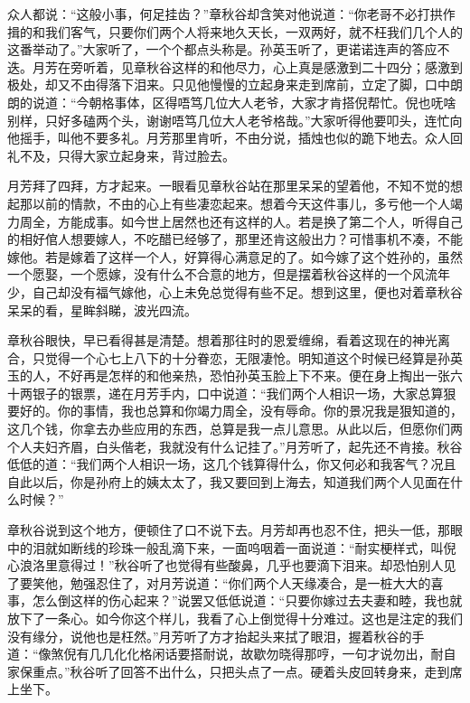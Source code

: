 \documentclass[12pt,UTF8]{ctexbook}
\begin{document}
{{{众人都说：“这般小事，何足挂齿？”章秋谷却含笑对他说道：“你老哥不必打拱作揖的和我们客气，只要你们两个人将来地久天长，一双两好，就不枉我们几个人的这番举动了。”大家听了，一个个都点头称是。孙英玉听了，更诺诺连声的答应不迭。月芳在旁听着，见章秋谷这样的和他尽力，心上真是感激到二十四分；感激到极处，却又不由得落下泪来。只见他慢慢的立起身来走到席前，立定了脚，口中朗朗的说道：“今朝格事体，区得唔笃几位大人老爷，大家才肯搭倪帮忙。倪也呒啥别样，只好多磕两个头，谢谢唔笃几位大人老爷格哉。”大家听得他要叩头，连忙向他摇手，叫他不要多礼。月芳那里肯听，不由分说，插烛也似的跪下地去。众人回礼不及，只得大家立起身来，背过脸去。

月芳拜了四拜，方才起来。一眼看见章秋谷站在那里呆呆的望着他，不知不觉的想起那以前的情款，不由的心上有些凄恋起来。想着今天这件事儿，多亏他一个人竭力周全，方能成事。如今世上居然也还有这样的人。若是换了第二个人，听得自己的相好倌人想要嫁人，不吃醋已经够了，那里还肯这般出力？可惜事机不凑，不能嫁他。若是嫁着了这样一个人，好算得心满意足的了。如今嫁了这个姓孙的，虽然一个愿娶，一个愿嫁，没有什么不合意的地方，但是摆着秋谷这样的一个风流年少，自己却没有福气嫁他，心上未免总觉得有些不足。想到这里，便也对着章秋谷呆呆的看，星眸斜睇，波光四流。

章秋谷眼快，早已看得甚是清楚。想着那往时的恩爱缠绵，看着这现在的神光离合，只觉得一个心七上八下的十分眷恋，无限凄怆。明知道这个时候已经算是孙英玉的人，不好再是怎样的和他亲热，恐怕孙英玉脸上下不来。便在身上掏出一张六十两银子的银票，递在月芳手内，口中说道：“我们两个人相识一场，大家总算狠要好的。你的事情，我也总算和你竭力周全，没有辱命。你的景况我是狠知道的，这几个钱，你拿去办些应用的东西，总算是我一点儿意思。从此以后，但愿你们两个人夫妇齐眉，白头偕老，我就没有什么记挂了。”月芳听了，起先还不肯接。秋谷低低的道：“我们两个人相识一场，这几个钱算得什么，你又何必和我客气？况且自此以后，你是孙府上的姨太太了，我又要回到上海去，知道我们两个人见面在什么时候？”

章秋谷说到这个地方，便顿住了口不说下去。月芳却再也忍不住，把头一低，那眼中的泪就如断线的珍珠一般乱滴下来，一面呜咽着一面说道：“耐实梗样式，叫倪心浪洛里意得过！”秋谷听了也觉得有些酸鼻，几乎也要滴下泪来。却恐怕别人见了要笑他，勉强忍住了，对月芳说道：“你们两个人天缘凑合，是一桩大大的喜事，怎么倒这样的伤心起来？”说罢又低低说道：“只要你嫁过去夫妻和睦，我也就放下了一条心。如今你这个样儿，我看了心上倒觉得十分难过。这也是注定的我们没有缘分，说他也是枉然。”月芳听了方才抬起头来拭了眼泪，握着秋谷的手道：“像煞倪有几几化化格闲话要搭耐说，故歇勿晓得那哼，一句才说勿出，耐自家保重点。”秋谷听了回答不出什么，只把头点了一点。硬着头皮回转身来，走到席上坐下。

}}}
\end{document}
